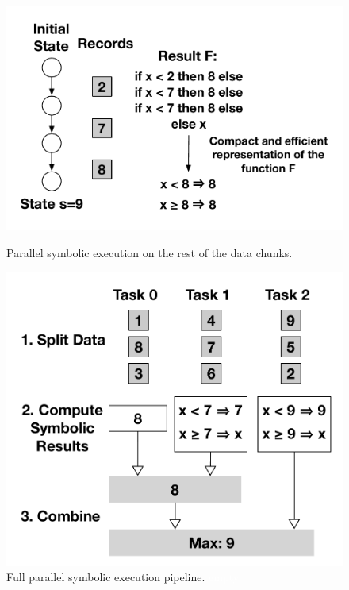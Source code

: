 \begin{refsection}
 \begin{figure}[H]
  \begin{minipage}[b]{0.47\textwidth}
    \begin{flushleft}
      \centering
      \includegraphics[scale=0.5]{figures/symple_ex7}
      \caption{Parallel symbolic execution on the rest of the data chunks.}
      \label{fig:symple_ex7}
    \end{flushleft}
  \end{minipage}
  \hfill
  \begin{minipage}[b]{0.47\textwidth}
    \begin{flushleft}
      \centering
      \includegraphics[scale=0.5]{figures/symple_ex8}
      \caption{Full parallel symbolic execution
        pipeline. \textcolor{white}{empty}}
      \label{fig:symple_ex8}
    \end{flushleft}
  \end{minipage}
\end{figure}


\end{refsection}
